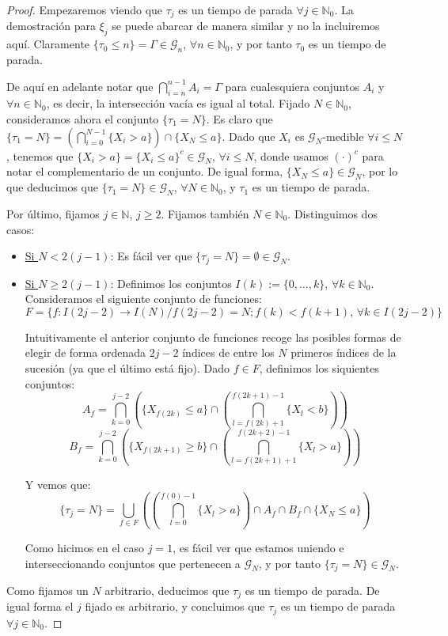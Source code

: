 \begin{proof}
Empezaremos viendo que $\tau _j$ es un tiempo de parada $\forall j\in \mathds{N}_0$. La demostración para $\xi _j$ se puede abarcar de manera similar y no la incluiremos aquí. Claramente $\{\tau_0\leq n\} = \Gamma \in \mathscr{G}_n$, $\forall n\in \mathds{N}_0$, y por tanto $\tau_0$ es un tiempo de parada.

De aquí en adelante notar que $\bigcap_{i=n}^{n-1}A_i =\Gamma$ para cualesquiera conjuntos $A_i$ y $\forall n\in\mathds{N}_0$, es decir, la intersección vacía es igual al total. Fijado $N\in\mathds{N}_0$, consideramos ahora el conjunto $\{\tau_1= N\}$. Es claro que $\{\tau_1= N\}=(\bigcap_{i=0}^{N-1}\{X_i>a\})\cap \{X_N\leq a\}$. Dado que $X_i$ es $\mathscr{G}_N$-medible $\forall i\leq N$, tenemos que $\{X_i>a\}=\{X_i\leq a\}^c \in\mathscr{G}_N$, $\forall i\leq N$, donde usamos $(\cdot) ^c$ para notar el complementario de un conjunto. De igual forma, $\{X_N\leq a\}\in\mathscr{G}_N$, por lo que deducimos que $\{\tau_1 = N\}\in\mathscr{G}_N$, $\forall N\in\mathds{N}_0$, y $\tau_1$ es un tiempo de parada.

Por último, fijamos $j\in\mathds{N}$, $j\geq 2$. Fijamos también $N\in\mathds{N}_0$. Distinguimos dos casos:
\begin{itemize}
\item \underline{Si $N<2(j-1)$}: Es fácil ver que $\{\tau_j=N\}=\emptyset\in \mathscr{G}_N$.
\item \underline{Si $N\geq2(j-1)$}: Definimos los conjuntos $I(k):=\{0,\ldots ,k\}$, $\forall k\in \mathds{N}_0$. Consideramos el siguiente conjunto de funciones:
$$F=\{f:I(2j-2)\rightarrow I(N)/ f(2j-2) = N; f(k)<f(k+1)\text{, }\forall k\in I(2j-2)\} $$

Intuitivamente el anterior conjunto de funciones recoge las posibles formas de elegir de forma ordenada $2j-2$ índices de entre los $N$ primeros índices de la sucesión (ya que el último está fijo). Dado $f\in F$, definimos los siquientes conjuntos:
$$A_f=\bigcap_{k=0}^{j-2}(\{X_{f(2k)}\leq a\} \cap (\bigcap_{l=f(2k)+1}^{f(2k+1)-1}\{X_{l}<b\}))$$
$$B_f=\bigcap_{k=0}^{j-2}(\{X_{f(2k+1)}\geq b\} \cap (\bigcap_{l=f(2k+1)+1}^{f(2k+2)-1}\{X_{l}>a\}))$$

Y vemos que:
$$\{\tau_j = N\} = \bigcup_{f\in F}((\bigcap_{l=0}^{f(0)-1}\{X_{l}>a\})\cap A_f \cap B_f \cap \{X_N\leq a\})$$

Como hicimos en el caso $j=1$, es fácil ver que estamos uniendo e interseccionando conjuntos que pertenecen a $\mathscr{G}_N$, y por tanto $\{\tau_j = N\}\in\mathscr{G}_N$.
\end{itemize}

Como fijamos un $N$ arbitrario, deducimos que $\tau_j$ es un tiempo de parada. De igual forma el $j$ fijado es arbitrario, y concluimos que $\tau_j$ es un tiempo de parada $\forall j\in\mathds{N}_0$.

\end{proof}

